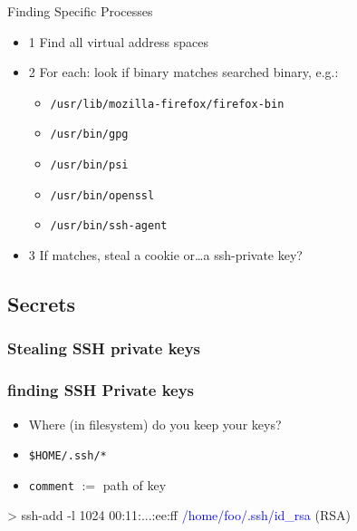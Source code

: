 \documentclass{beamer}
\newenvironment{itemizeframe}[1]
  {\begin{frame}{#1}\startitemizeframe}
  {\stopitemizeframe\end{frame}}
\newcommand\startitemizeframe{\begin{itemize}}
\newcommand\stopitemizeframe{\end{itemize}}
\begin{document}
		\begin{itemizeframe}{Finding Specific Processes}
			\item[1] Find all virtual address spaces
			\item[2] For each: look if binary matches searched binary, e.g.:
			\begin{itemize}
				\item \texttt{/usr/lib/mozilla-firefox/firefox-bin}
				\item \texttt{/usr/bin/gpg}
				\item \texttt{/usr/bin/psi}
				\item \texttt{/usr/bin/openssl}
				\item \texttt{/usr/bin/ssh-agent}
			\end{itemize}
			\item[3] If matches, steal a cookie or\ldots a \alert<2->{ssh-private key}?
		\end{itemizeframe}

	\subsection{Secrets}

		\begin{frame} \frametitle{Stealing SSH private keys}

		\end{frame}

		\begin{frame}[fragile] \frametitle{finding SSH Private keys}
			\begin{itemize}
				\item Where (in filesystem) do you keep your keys?
				\item \texttt{\$HOME/.ssh/*}
				\item \texttt{comment} $:=$ path of key
			\end{itemize}
			\begin{semiverbatim}
				> ssh-add -l
				1024 00:11:...:ee:ff \textcolor{blue}{/home/foo/.ssh/id_rsa} (RSA)
			\end{semiverbatim}
		\end{frame}
\end{document}
